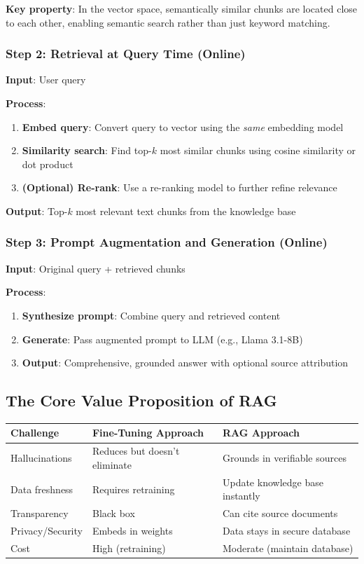 \documentclass{article}
\begin{document}
\textbf{Key property}: In the vector space, semantically similar chunks are located close to each other, enabling semantic search rather than just keyword matching.

\subsubsection{Step 2: Retrieval at Query Time (Online)}

\textbf{Input}: User query

\textbf{Process}:
\begin{enumerate}
\item \textbf{Embed query}: Convert query to vector using the \textit{same} embedding model
\item \textbf{Similarity search}: Find top-$k$ most similar chunks using cosine similarity or dot product
\item \textbf{(Optional) Re-rank}: Use a re-ranking model to further refine relevance
\end{enumerate}

\textbf{Output}: Top-$k$ most relevant text chunks from the knowledge base

\subsubsection{Step 3: Prompt Augmentation and Generation (Online)}

\textbf{Input}: Original query + retrieved chunks

\textbf{Process}:
\begin{enumerate}
\item \textbf{Synthesize prompt}: Combine query and retrieved content
\item \textbf{Generate}: Pass augmented prompt to LLM (e.g., Llama 3.1-8B)
\item \textbf{Output}: Comprehensive, grounded answer with optional source attribution
\end{enumerate}

\subsection{The Core Value Proposition of RAG}

\begin{center}
\begin{tabular}{lll}
\toprule
\textbf{Challenge} & \textbf{Fine-Tuning Approach} & \textbf{RAG Approach} \\
\midrule
Hallucinations & Reduces but doesn't eliminate & Grounds in verifiable sources \\
Data freshness & Requires retraining & Update knowledge base instantly \\
Transparency & Black box & Can cite source documents \\
Privacy/Security & Embeds in weights & Data stays in secure database \\
Cost & High (retraining) & Moderate (maintain database) \\
\bottomrule
\end{tabular}
\end{center}
\end{document}
